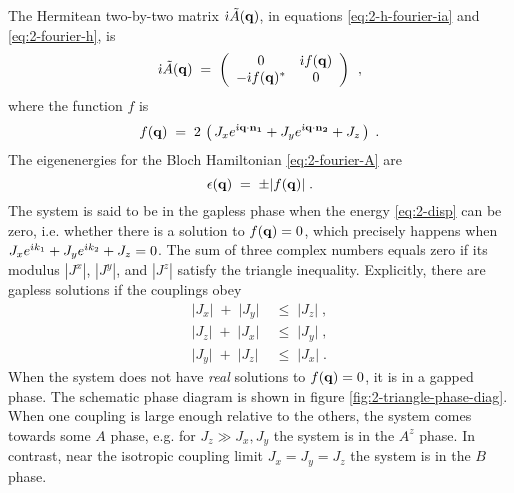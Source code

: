 The Hermitean two-by-two matrix $\im \tilde{A}(\bf{q})$, in equations \eqref{eq:2-h-fourier-ia} and \eqref{eq:2-fourier-h}, is 
\begin{equation}
    \im \tilde{A}(\bf{q}) \; = \;\left( \begin{array}{cc}
         0&\im f(\bf{q})   \\
        -\im f(\bf{q})^{\ast}  & 0 
    \end{array}  \right)\,  \label{eq:2-fourier-A} \; ,  %
\end{equation}
where the function $f$ is%
\begin{equation}
    f(\bf{q}) \; = \; 2 \, \left( \, J_x e^{\im \bf{q}\cdot \bf{n_1}} + J_y e^{\im \bf{q}\cdot \bf{n_2}} + J_z \, \right) \; .
\end{equation}
The eigenenergies for the Bloch Hamiltonian \eqref{eq:2-fourier-A} are 
\begin{equation}
    \epsilon(\bf{q}) \; = \; \pm \vert f(\bf{q}) \vert \; . \label{eq:2-disp}
\end{equation}
The system is said to be in the gapless phase when the energy \eqref{eq:2-disp} can be zero, i.e. whether there is a solution to $f(\bf{q}) = 0 $, which precisely happens when $J_x e^{\im k_1} + J_y e^{\im k_2} + J_z = 0$. The sum of three complex numbers equals zero if its modulus $|J^x|$, $|J^y|$, and $|J^z|$ satisfy the triangle inequality. Explicitly, there are gapless solutions if the couplings obey\begin{align}
\vert J_x \vert \;  + \; \vert J_y \vert \;  & \leq \; \vert J_z \vert \; , \\
\vert J_z \vert  \; + \; \vert J_x \vert  \; & \leq \; \vert J_y \vert \; , \\
\vert J_y \vert \;  + \; \vert J_z \vert  \; & \leq \; \vert J_x \vert \;  .
\end{align}%
When the system does not have \textit{real} solutions to $f(\bf{q}) = 0$, it is in a gapped phase. The schematic phase diagram is shown in figure \ref{fig:2-triangle-phase-diag}. When one coupling is large enough relative to the others, the system comes towards some $A$ phase, e.g. for $J_z \gg J_x, J_y$ the system is in the $A^z$ phase. In contrast, near the isotropic coupling limit $J_x=J_y=J_z$ the system is in the $B$ phase.

